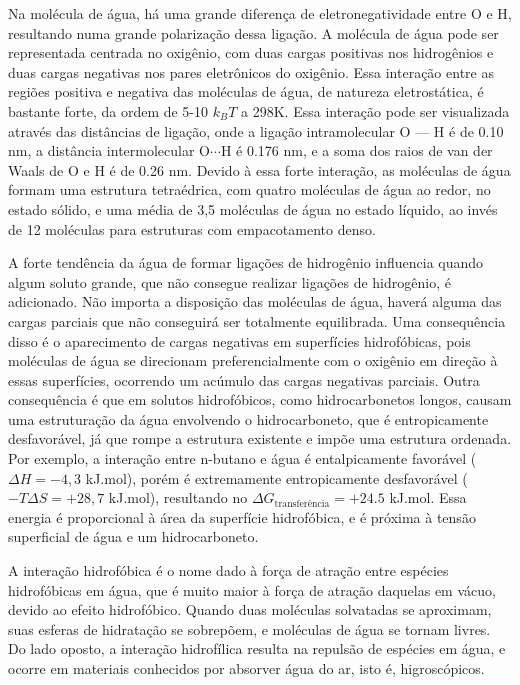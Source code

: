 	Na molécula de água, há uma grande diferença de eletronegatividade entre O e H, resultando numa grande polarização dessa ligação. A molécula de água pode ser representada centrada no oxigênio, com duas cargas positivas nos hidrogênios e duas cargas negativas nos pares eletrônicos do oxigênio. Essa interação entre as regiões positiva e negativa das moléculas de água, de natureza eletrostática, é bastante forte, da ordem de 5-10 \(k_BT\) a 298K. Essa interação pode ser visualizada através das distâncias de ligação, onde a ligação intramolecular O --- H é de 0.10 nm, a distância intermolecular \(\mathrm{O} \cdots \mathrm{H}\) é 0.176 nm, e a soma dos raios de van der Waals de O e H é de 0.26 nm. Devido à essa forte interação, as moléculas de água formam uma estrutura tetraédrica, com quatro moléculas de água ao redor, no estado sólido, e uma média de 3,5 moléculas de água no estado líquido, ao invés de 12 moléculas para estruturas com empacotamento denso.
	
	A forte tendência da água de formar ligações de hidrogênio influencia quando algum soluto grande, que não consegue realizar ligações de hidrogênio, é adicionado. Não importa a disposição das moléculas de água, haverá alguma das cargas parciais que não conseguirá ser totalmente equilibrada. Uma consequência disso é o aparecimento de cargas negativas em superfícies hidrofóbicas, pois moléculas de água se direcionam preferencialmente com o oxigênio em direção à essas superfícies, ocorrendo um acúmulo das cargas negativas parciais. Outra consequência é que em solutos hidrofóbicos, como hidrocarbonetos longos, causam uma estruturação da água envolvendo o hidrocarboneto, que é entropicamente desfavorável, já que rompe a estrutura existente e impõe uma estrutura ordenada. Por exemplo, a interação entre n-butano e água é entalpicamente favorável (\(\Delta H = -4,3\) kJ.mol\menosUm), porém é extremamente entropicamente desfavorável (\(-T\Delta S = +28,7\) kJ.mol\menosUm), resultando no \(\Delta G_{\mathrm{transferência}} = +24.5\) kJ.mol\menosUm. Essa energia é proporcional à área da superfície hidrofóbica, e é próxima à tensão superficial de água e um hidrocarboneto. 
	
	A interação hidrofóbica é o nome dado à força de atração entre espécies hidrofóbicas em água, que é muito maior à força de atração daquelas em vácuo, devido ao efeito hidrofóbico. Quando duas moléculas solvatadas se aproximam, suas esferas de hidratação se sobrepõem, e moléculas de água se tornam livres. Do lado oposto, a interação hidrofílica resulta na repulsão de espécies em água, e ocorre em materiais conhecidos por absorver água do ar, isto é, higroscópicos.
	
